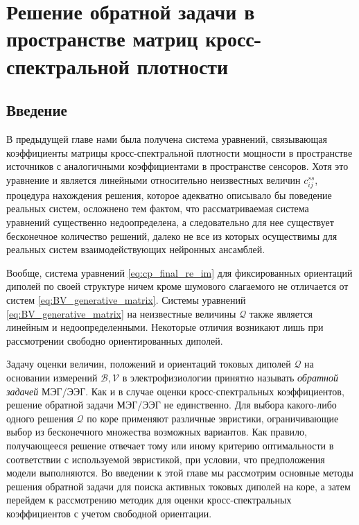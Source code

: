 \chapter{Решение обратной задачи в пространстве матриц кросс-спектральной плотности} \label{chapt2}


\section{Введение}

В предыдущей главе нами была получена система уравнений, связывающая коэффициенты матрицы
кросс-спектральной плотности мощности в пространстве источников с аналогичными коэффициентами в
пространстве сенсоров. Хотя это уравнение и является линейными относительно неизвестных
величин $c_{ij}^{ss}$, процедура нахождения решения, которое адекватно описывало бы
поведение реальных систем, осложнено тем фактом, что рассматриваемая система уравнений
существенно недоопределена, а следовательно для нее существует бесконечное количество решений,
далеко не все из которых осуществимы для реальных систем взаимодействующих нейронных ансамблей.

Вообще, система уравнений \ref{eq:cp_final_re_im} для фиксированных ориентаций диполей
по своей структуре ничем кроме шумового слагаемого не отличается от систем \ref{eq:BV_generative_matrix}.
Системы уравнений \ref{eq:BV_generative_matrix} на неизвестные величины $\mathcal{Q}$ также является
линейным и недоопределенными. Некоторые отличия возникают лишь при рассмотрении свободно ориентированных диполей.

Задачу оценки величин, положений и ориентаций токовых диполей $\mathcal{Q}$
на основании измерений $\mathcal{B}, \mathcal{V}$ в электрофизиологии принятно называть \emph{обратной задачей} МЭГ/ЭЭГ.
Как и в случае оценки кросс-спектральных коэффициентов, решение обратной задачи МЭГ/ЭЭГ не единственно.
Для выбора какого-либо одного решения $\mathcal{Q}$ по коре применяют различные эвристики,
ограничивающие выбор из бесконечного множества возможных вариантов.
Как правило, получающееся решение отвечает тому или иному критерию оптимальности в соответствии с используемой эвристикой,
при условии, что предположения модели выполняются.
Во введении к этой главе мы рассмотрим основные методы решения обратной задачи для поиска
активных токовых диполей на коре, а затем перейдем к рассмотрению методик для оценки
кросс-спектральных коэффициентов с учетом свободной ориентации.

